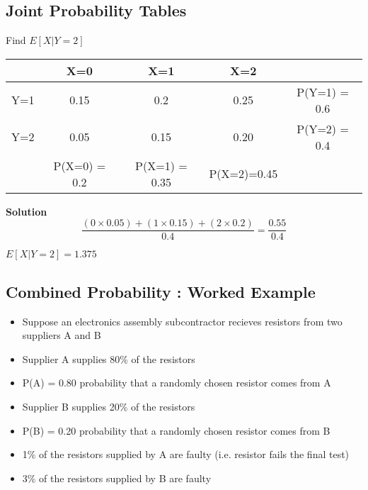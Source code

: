 \documentclass[]{report}
\begin{document}
\subsection{Joint Probability Tables}

Find $E[X|Y=2]$

\begin{tabular}{ccccc}
	& X=0  & X=1  & X=2  &              \\ \hline
	Y=1 & 0.15 & 0.2  & 0.25 & P(Y=1) = 0.6 \\ \hline
	Y=2 & 0.05 & 0.15 & 0.20 & P(Y=2) = 0.4 \\ \hline
	& P(X=0) = 0.2  & P(X=1) = 0.35  & P(X=2)=0.45  &              \\ \hline
\end{tabular}



\textbf{Solution}
\[   \frac{(0 \times 0.05) + (1 \times 0.15)+(2 \times 0.2) }{0.4}  = \frac{0.55}{0.4}  \] 

$E[X|Y=2] = 1.375$


\subsection{Combined Probability : Worked Example}	

\begin{itemize}
	\item 		
	Suppose an electronics assembly subcontractor recieves resistors from two suppliers A and B
	
	\item 		Supplier A supplies 80\% of the resistors
	
	\item 		P(A) = 0.80 probability that a randomly chosen resistor comes from A
	
	\item 		Supplier B supplies 20\% of the resistors
	
	\item 		P(B) = 0.20 probability that a randomly chosen resistor comes from B
	
\end{itemize}		

\begin{itemize}
	\item 1\% of the resistors supplied by A are faulty (i.e. resistor fails the final test)
	\item 3\% of the resistors supplied by B are faulty 
\end{itemize}
\end{document}
